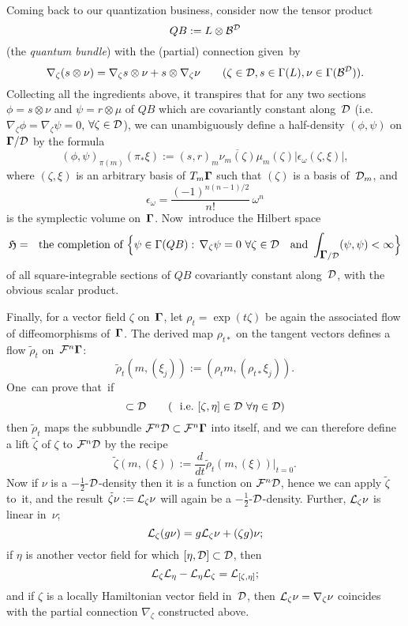\documentclass[11pt]{amsart}
\numberwithin{equation}{section}
\theoremstyle{remark}
\newcommand\Omg{{\bigam}}   %
\newcommand\FF{\Cal F}
\newcommand\DD{{\Cal D}}
\newcommand\MD{{\Omg/\DD}}
\newcommand\mhD{$-\tfrac12$-$\DD$}
\newcommand\BB{\Cal B}
\newcommand\LL{\Cal L}
\newcommand\HH{\mathfrak H}
\newcommand{\bigam}{\mbox{\boldmath $\Gamma$}}
\begin{document}
Coming back to our quantization business, consider now the tensor product
\begin{equation}  QB := L\otimes \BB^\DD  \label{tag:QBU}  \end{equation}
(the {\sl quantum bundle\/}) with the (partial) connection given~by
\begin{equation}  \nabla_\zeta(s\otimes\nu)=\nabla_\zeta s\otimes\nu +
s\otimes\nabla_\zeta\nu \qquad (\zeta\in\DD, s\in\Gamma(L),
\nu\in\Gamma(\BB^\DD)).  \label{tag:HDCC}  \end{equation}
Collecting all the ingredients above, it transpires that for any two sections
$\phi=s\otimes\nu$ and $\psi=r\otimes\mu$ of $QB$ which are covariantly
constant along~$\DD$ (i.e.~$\nabla_\zeta\phi=\nabla_\zeta\psi=0$, \;
$\forall\zeta\in\DD$), we can unambiguously define a half-density $(\phi,\psi)$
on $\MD$ by the formula
$$ (\phi,\psi)_{\pi(m)}(\pi_*\xi) := (s,r)_m \overline{\nu_m(\zeta)}
\mu_m(\zeta) |\epsilon_\omega (\zeta,\xi)|,  $$
where $(\zeta,\xi)$ is an arbitrary basis of $T_m \Omg$ such that $(\zeta)$ is
a basis of~$\DD_m$, and
\begin{equation}  \epsilon_\omega = \frac{(-1)^{n(n-1)/2}}{n!} \, \omega^n
\label{tag:HDEE}  \end{equation}
is the symplectic volume on~$\Omg$. Now~introduce the Hilbert space
$$ \HH=\text{the completion of } \Big\{ \psi\in\Gamma(QB):\,\nabla_\zeta \psi=0
\ \forall\zeta\in\DD \text{ and } \int_{\MD} (\psi,\psi) <\infty \Big\}   $$
of all square-integrable sections of $QB$ covariantly constant along~$\DD$,
with the obvious scalar product.

Finally, for a vector field $\zeta$ on~$\Omg$, let $\rho_t=\exp(t\zeta)$ be
again the associated flow of diffeomorphisms of~$\Omg$. The derived map
$\rho_{t*}$ on the tangent vectors defines a flow $\tilde\rho_t$
on~$\FF^n \Omg$:
$$ \tilde\rho_t (m,(\xi_j)) := (\rho_t m,(\rho_{t*}\xi_j)).  $$
One~can prove that~if
\begin{equation}  [\zeta,\DD]\subset\DD \qquad
(\text{i.e.~} [\zeta,\eta]\in\DD\ \forall\eta\in\DD)  \label{tag:HDD}
\end{equation}
then $\tilde\rho_t$ maps the subbundle $\FF^n\DD\subset\FF^n \Omg$ into itself,
and we can therefore define a lift $\tilde\zeta$ of $\zeta$ to $\FF^n\DD$ by
the recipe
$$ \tilde\zeta (m,(\xi)) := \frac d{dt} \tilde\rho_t(m,(\xi)) \Big|_{t=0}.  $$
Now if $\nu$ is a \mhD-density then it is a function on $\FF^n\DD$, hence we
can apply $\tilde\zeta$ to~it, and the result $\tilde\zeta\nu:=\LL_\zeta\nu$
will again be a \mhD-density. Further, $\LL_\zeta\nu$ is linear in~$\nu$;
\begin{equation}  \LL_\zeta(g\nu) = g\LL_\zeta\nu+(\zeta g)\nu;
\label{tag:LIEA}  \end{equation}
if $\eta$ is another vector field for which $[\eta,\DD]\subset\DD$, then
\begin{equation}  \LL_\zeta\LL_\eta-\LL_\eta\LL_\zeta = \LL_{[\zeta,\eta]};
\label{tag:LIEB}  \end{equation}
and if $\zeta$ is a locally Hamiltonian vector field in~$\DD$, then
$\LL_\zeta\nu=\nabla_\zeta\nu$ coincides with the partial connection
$\nabla_\zeta$ constructed above.
\end{document}
